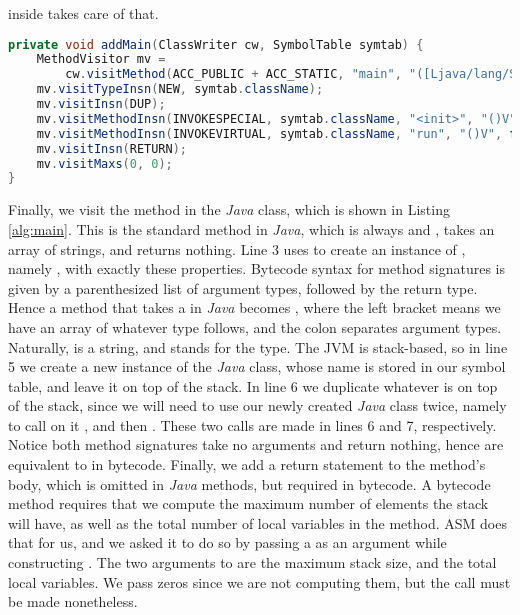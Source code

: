 inside  takes care of that.

\begin{lstlisting}[language=Java,caption={Using the ASM framework to construct a \il{main} method.},label={alg:main}]
private void addMain(ClassWriter cw, SymbolTable symtab) {
	MethodVisitor mv =
		cw.visitMethod(ACC_PUBLIC + ACC_STATIC, "main", "([Ljava/lang/String;)V", null, null);
	mv.visitTypeInsn(NEW, symtab.className);
	mv.visitInsn(DUP);
	mv.visitMethodInsn(INVOKESPECIAL, symtab.className, "<init>", "()V", false);
	mv.visitMethodInsn(INVOKEVIRTUAL, symtab.className, "run", "()V", false);
	mv.visitInsn(RETURN);
	mv.visitMaxs(0, 0);
}
\end{lstlisting}

Finally, we visit the  method in the \emph{Java} class, which is shown in Listing \ref{alg:main}. This is the standard  method in \emph{Java}, which is always  and , takes an array of strings, and returns nothing. Line 3 uses  to create an instance of , namely , with exactly these properties. Bytecode syntax for method signatures is given by a parenthesized list of argument types, followed by the return type. Hence a  method that takes a  in \emph{Java} becomes \il{([Ljava/lang/String;)V}, where the left bracket means we have an array of whatever type follows, and the colon separates argument types. Naturally,  is a string, and  stands for the  type. The JVM is stack-based, so in line 5 we create a new instance of the \emph{Java} class, whose name is stored in our symbol table, and leave it on top of the stack. In line 6 we duplicate whatever is on top of the stack, since we will need to use our newly created \emph{Java} class twice, namely to call on it , and then . These two calls are made in lines 6 and 7, respectively. Notice both method signatures take no arguments and return nothing, hence are equivalent to  in bytecode. Finally, we add a return statement to the  method's body, which is omitted in  \emph{Java} methods, but required in bytecode. A bytecode method requires that we compute the maximum number of elements the stack will have, as well as the total number of local variables in the method. ASM does that for us, and we asked it to do so by passing a  as an argument while constructing . The two arguments to  are the maximum stack size, and the total local variables. We pass zeros since we are not computing them, but the call must be made nonetheless.

